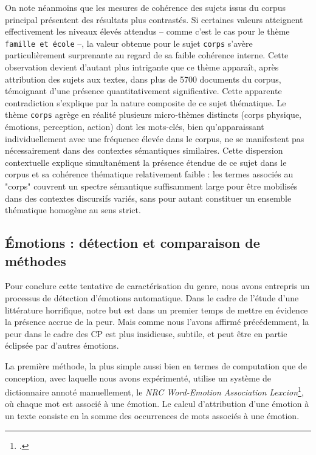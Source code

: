 \documentclass[12pt,a4paper,oneside,titlepage]{book} %
\begin{document}
On note néanmoins que les mesures de cohérence des sujets issus du corpus principal présentent des résultats plus contrastés. Si certaines valeurs atteignent effectivement les niveaux élevés attendus – comme c'est le cas pour le thème \texttt{famille et école} –, la valeur obtenue pour le sujet \texttt{corps} s'avère particulièrement surprenante au regard de sa faible cohérence interne. Cette observation devient d'autant plus intrigante que ce thème apparaît, après attribution des sujets aux textes, dans plus de 5700 documents du corpus, témoignant d'une présence quantitativement significative.
Cette apparente contradiction s'explique par la nature composite de ce sujet thématique. Le thème \texttt{corps} agrège en réalité plusieurs micro-thèmes distincts (corps physique, émotions, perception, action) dont les mots-clés, bien qu'apparaissant individuellement avec une fréquence élevée dans le corpus, ne se manifestent pas nécessairement dans des contextes sémantiques similaires. Cette dispersion contextuelle explique simultanément la présence étendue de ce sujet dans le corpus et sa cohérence thématique relativement faible : les termes associés au "corps" couvrent un spectre sémantique suffisamment large pour être mobilisés dans des contextes discursifs variés, sans pour autant constituer un ensemble thématique homogène au sens strict.



\subsection{Émotions : détection et comparaison de méthodes}


Pour conclure cette tentative de caractérisation du genre, nous avons entrepris un processus de détection d'émotions automatique. Dans le cadre de l'étude d'une littérature horrifique, notre but est dans un premier temps de mettre en évidence la présence accrue de la peur. Mais comme nous l'avons affirmé précédemment, la peur dans le cadre des CP est plus insidieuse, subtile, et peut être en partie éclipsée par d'autres émotions. 

La première méthode, la plus simple aussi bien en termes de computation que de conception, avec laquelle nous avons expérimenté, utilise un système de dictionnaire annoté manuellement, le \emph{NRC Word-Emotion Association Lexcion}\footcite{mohammad_crowdsourcing_2013}, où chaque mot est associé à une émotion. Le calcul d'attribution d'une émotion à un texte consiste en la somme des occurrences de mots associés à une émotion.  %
\end{document}
